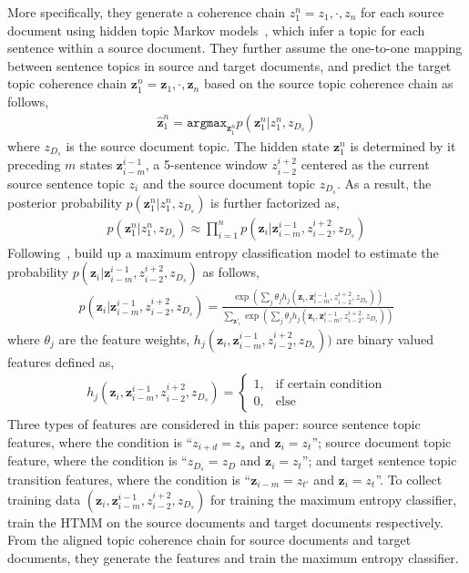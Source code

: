 More specifically, they generate a coherence chain $z_1^n = z_1, \cdot, z_n$ for each source document using hidden topic Markov models~\citep[HTMM]{gruber-07}, which infer a topic for each sentence within a source document. They further assume the one-to-one mapping between sentence topics in source and target documents, and predict the target topic coherence chain $\textbf{z}_1^n = \textbf{z}_1, \cdot, \textbf{z}_n$ based on the source topic coherence chain as follows,
\begin{align}
\hat{\textbf{z}}_1^n = \texttt{argmax}_{\textbf{z}_1^n} p (\textbf{z}_1^n | z_1^n, z_{D_s})
\end{align}
where $z_{D_s}$ is the source document topic. The hidden state $\textbf{z}_1^n$ is determined by it preceding $m$ states $\textbf{z}_{i-m}^{i-1}$, a 5-sentence window $z_{i-2}^{i+2}$ centered as the current source sentence topic $z_i$ and the source document topic $z_{D_s}$. As a result, the posterior probability $p (\textbf{z}_1^n | z_1^n, z_{D_s})$ is further factorized as,
\begin{align}
p (\textbf{z}_1^n | z_1^n, z_{D_s}) \approx \prod_{i=1}^n p(\textbf{z}_i | \textbf{z}_{i-m}^{i-1}, z_{i-2}^{i+2}, z_{D_s})
\end{align}
Following~\citet{Xiong-2006}, \citet{xiong-13} build up a maximum entropy classification model to estimate the probability $p(\textbf{z}_i | \textbf{z}_{i-m}^{i-1}, z_{i-2}^{i+2}, z_{D_s})$ as follows,
\begin{align}
p(\textbf{z}_i | \textbf{z}_{i-m}^{i-1}, z_{i-2}^{i+2}, z_{D_s}) = \frac{\exp(\sum_j \theta_j h_j(\textbf{z}_i, \textbf{z}_{i-m}^{i-1}, z_{i-2}^{i+2}, z_{D_s}))}{\sum_{\textbf{z}'_i} \exp(\sum_j \theta_j h_j(\textbf{z}_i, \textbf{z}_{i-m}^{i-1}, z_{i-2}^{i+2}, z_{D_s}))}
\end{align}
where $\theta_j$ are the feature weights, $ h_j(\textbf{z}_i, \textbf{z}_{i-m}^{i-1}, z_{i-2}^{i+2}, z_{D_s}))$ are binary valued features defined as, 
\begin{align}
 h_j(\textbf{z}_i, \textbf{z}_{i-m}^{i-1}, z_{i-2}^{i+2}, z_{D_s}) = \begin{cases}
1, &\text{if certain condition} \\
0, &\text{else}
\end{cases}
\end{align}
Three types of features are considered in this paper: source sentence topic features, where the condition is ``$z_{i+d} = z_s$ and $\textbf{z}_i = z_t$''; source document topic feature, where the condition is ``$z_{D_s} = z_D$ and $\textbf{z}_i = z_t$'';  and target sentence topic transition features, where the condition is ``$\textbf{z}_{i-m} = z_{t'}$ and $\textbf{z}_i = z_t$''. To collect training data $(\textbf{z}_i, \textbf{z}_{i-m}^{i-1}, z_{i-2}^{i+2}, z_{D_s})$ for training the maximum entropy classifier, \citet{xiong-13} train the HTMM on the source documents and target documents respectively. From the aligned topic coherence chain for source documents and target documents, they generate the features and train the maximum entropy classifier. 

